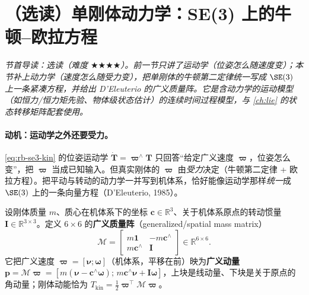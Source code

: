 \section{（选读）单刚体动力学：SE(3) 上的牛顿--欧拉方程}
\label{sec:rb-dynamics}
\noindent\emph{节首导读：选读（难度 $\bigstar\bigstar\bigstar\bigstar$）。前一节只讲了\emph{运动学}（位姿怎么随速度变）；本节补上\emph{动力学}（速度怎么随受力变），把单刚体的牛顿第二定律统一写成 $\SE(3)$ 上一条紧凑方程，并给出 D'Eleuterio 的广义质量阵。它是含动力学的运动模型（如恒力/恒力矩先验、物体级状态估计）的连续时间过程模型，与 \cref{ch:lie} 的状态转移矩阵配套使用。}

\paragraph{动机：运动学之外还要受力。}\cref{eq:rb-se3-kin} 的位姿运动学 $\dot{\mathbf{T}}=\boldsymbol{\varpi}^\wedge\mathbf{T}$ 只回答“给定广义速度 $\boldsymbol{\varpi}$，位姿怎么变”，把 $\boldsymbol{\varpi}$ 当成已知输入。但真实刚体的 $\boldsymbol{\varpi}$ 由\emph{受力}决定（牛顿第二定律 + 欧拉方程）。把平动与转动的动力学一并写到机体系，恰好能像运动学那样\emph{统一}成 $\SE(3)$ 上的一条向量方程\cite{barfoot2024state}（D'Eleuterio, 1985）。

\begin{definition}[广义质量阵与广义动量]\label{def:rb-genmass}
设刚体质量 $m$、质心在机体系下的坐标 $\mathbf{c}\in\mathbb{R}^3$、关于机体系原点的转动惯量 $\mathbf{I}\in\mathbb{R}^{3\times3}$。定义 $6\times6$ 的\textbf{广义质量阵}（generalized/spatial mass matrix）
\begin{equation}
  \boldsymbol{\mathcal{M}}=\begin{bmatrix}m\mathbf{1}&-m\mathbf{c}^\wedge\\ m\mathbf{c}^\wedge&\mathbf{I}\end{bmatrix}\in\mathbb{R}^{6\times6}.
  \label{eq:rb-genmass}
\end{equation}
它把广义速度 $\boldsymbol{\varpi}=[\boldsymbol{\nu};\boldsymbol{\omega}]$（机体系，平移在前）映为\textbf{广义动量} $\mathbf{p}=\boldsymbol{\mathcal{M}}\boldsymbol{\varpi}=[m(\boldsymbol{\nu}-\mathbf{c}^\wedge\boldsymbol{\omega});\,m\mathbf{c}^\wedge\boldsymbol{\nu}+\mathbf{I}\boldsymbol{\omega}]$，上块是线动量、下块是关于原点的角动量；刚体动能恰为 $T_{\text{kin}}=\tfrac12\boldsymbol{\varpi}^\top\boldsymbol{\mathcal{M}}\boldsymbol{\varpi}$。
\end{definition}

